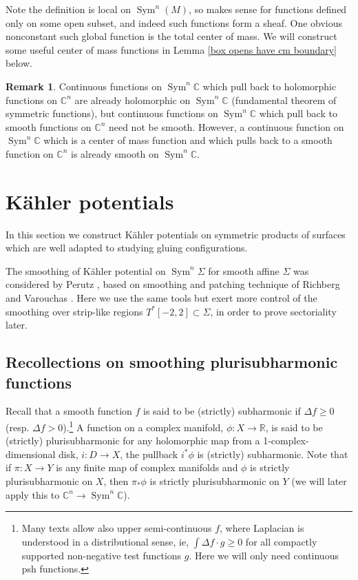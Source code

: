 \documentclass{article}
\def\R{\mathbb{R}}
\def\C{\mathbb{C}}
\def\In{\subset}
\DeclareMathOperator{\Sym}{Sym}
\theoremstyle{definition}
\newtheorem{remark}[theorem]{Remark}
\begin{document}
Note the definition is local on $\Sym^n(M)$, so makes sense for functions defined only on some open subset, and indeed such functions form a sheaf.  One obvious nonconstant such global function is the total center of mass. We will construct some useful center of mass functions in Lemma \ref{box opens have cm boundary} below.   

\begin{remark}
    Continuous functions on $\Sym^n \C$ which pull back to holomorphic functions on $\C^n$ are already holomorphic on $\Sym^n \C$ (fundamental theorem of symmetric functions), but  continuous functions on $\Sym^n \C$ which pull back to smooth functions on $\C^n$ need not be smooth.  However, a continuous function on $\Sym^n \C$ which is a center of mass function and which pulls back to a smooth function on $\C^n$ is already smooth on $\Sym^n \C$.  
\end{remark}

\section{K\"ahler potentials} \label{sec: kp}

In this section we construct K\"ahler potentials on symmetric products of surfaces which are well adapted to studying gluing configurations. 

The smoothing of K\"ahler potential on $\Sym^n \Sigma$ for smooth affine $\Sigma$ was considered by Perutz \cite[Section 7]{perutz2008hamiltonian}, based on smoothing and patching technique of Richberg \cite{richberg1967stetige} and Varouchas \cite{varouchas1984stabilite}. Here we use the same tools but exert more control of the smoothing over  strip-like regions $T^*[-2,2] \In \Sigma$, in order to prove sectoriality later. 


\subsection{Recollections on smoothing plurisubharmonic functions}

Recall that a
smooth function $f$ is said to be (strictly) subharmonic if   
$\Delta f \ge 0$ (resp. $\Delta f > 0$).\footnote{Many texts allow also upper semi-continuous $f$, where Laplacian is understood in a distributional sense, ie, $\int \Delta f \cdot g \geq 0$ for all compactly supported non-negative test functions $g$.  Here we will only need continuous psh functions.}
A function on a complex manifold, $\phi: X \to \R$, is said to be (strictly) plurisubharmonic for any holomorphic map from a 1-complex-dimensional disk, $i: D \to X$, the pullback $i^* \phi$ is (strictly) subharmonic.  Note that if $\pi: X \to Y$ is any finite map of complex manifolds and $\phi$ is strictly plurisubharmonic on $X$, then $\pi_* \phi$ is strictly plurisubharmonic on $Y$ (we will later apply this to $\C^n \to \Sym^n \C$). 
\end{document}
